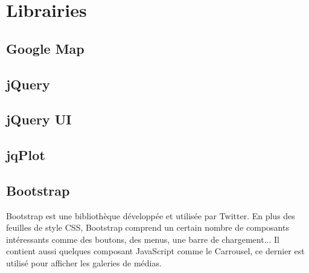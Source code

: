 \documentclass[twoside]{EPURapport}
\begin{document}
	\section{Librairies}
	\label{lib}

		
		
		
	
		
		\subsection{Google Map}
		\label{lib:map}
		
		\subsection{jQuery}
		\label{lib:jquery}
		
		\subsection{jQuery UI}
		\label{lib:jqueryui}
	
		\subsection{jqPlot}
		\label{lib:jqplot}
		
		\subsection{Bootstrap}
		\label{lib:bootstrap}
		Bootstrap est une bibliothèque développée et utilisée par Twitter. En plus des feuilles de style CSS, Bootstrap comprend un certain nombre de composants intéressants comme des boutons, des menus, une barre de chargement... Il contient aussi quelques composant JavaScript comme le Carrousel, ce dernier est utilisé pour  afficher les galeries de médias.\\
		
\end{document}
